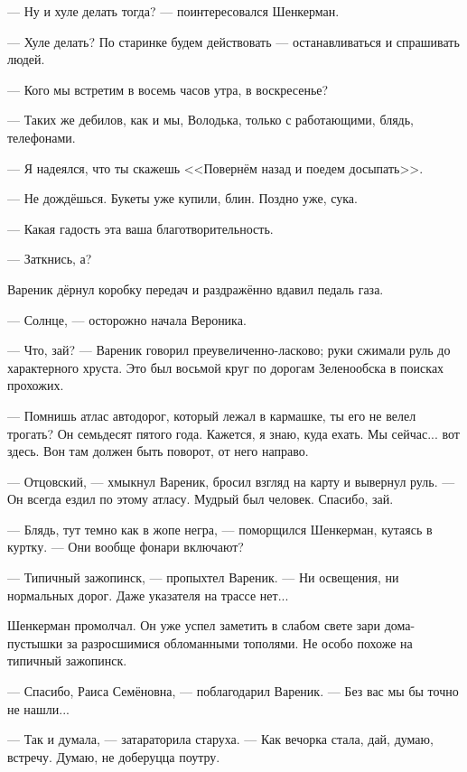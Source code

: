 --- Ну и хуле делать тогда? --- поинтересовался Шенкерман.

--- Хуле делать?
По старинке будем действовать --- останавливаться и спрашивать людей.

--- Кого мы встретим в восемь часов утра, в воскресенье?

--- Таких же дебилов, как и мы, Володька, только с работающими, блядь, телефонами.

--- Я надеялся, что ты скажешь <<Повернём назад и поедем досыпать>>.

--- Не дождёшься.
Букеты уже купили, блин.
Поздно уже, сука.

--- Какая гадость эта ваша благотворительность.

--- Заткнись, а?

Вареник дёрнул коробку передач и раздражённо вдавил педаль газа.

\asterism

\textspace

--- Солнце, --- осторожно начала Вероника.

--- Что, зай? --- Вареник говорил преувеличенно-ласково;
руки сжимали руль до характерного хруста.
Это был восьмой круг по дорогам Зеленообска в поисках прохожих.

--- Помнишь атлас автодорог, который лежал в кармашке, ты его не велел трогать?
Он семьдесят пятого года.
Кажется, я знаю, куда ехать.
Мы сейчас... вот здесь.
Вон там должен быть поворот, от него направо.

--- Отцовский, --- хмыкнул Вареник, бросил взгляд на карту и вывернул руль.
--- Он всегда ездил по этому атласу.
Мудрый был человек.
Спасибо, зай.

--- Блядь, тут темно как в жопе негра, --- поморщился Шенкерман, кутаясь в куртку.
--- Они вообще фонари включают?

--- Типичный зажопинск, --- пропыхтел Вареник.
--- Ни освещения, ни нормальных дорог.
Даже указателя на трассе нет...

Шенкерман промолчал.
Он уже успел заметить в слабом свете зари дома-пустышки за разросшимися обломанными тополями.
Не особо похоже на типичный зажопинск.

\asterism

\textspace

--- Спасибо, Раиса Семёновна, --- поблагодарил Вареник.
--- Без вас мы бы точно не нашли...

--- Так и думала, --- затараторила старуха.
--- Как вечорка стала, дай, думаю, встречу.
Думаю, не доберуцца поутру.

